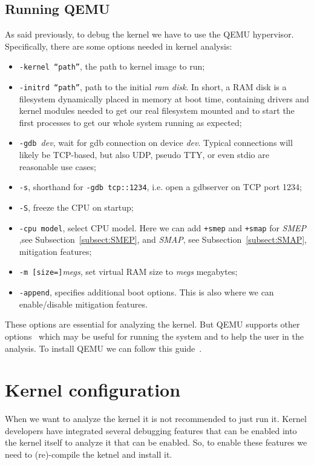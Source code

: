 \documentclass{masterthesis}
\newcommand{\refToSubSection}[1]{Subsection~\ref{subsect:#1}\xspace}
\begin{document}
\subsection{Running QEMU}
\label{subsect:QEMU}
As said previously, to debug the kernel we have to use the QEMU hypervisor. Specifically, there are some options needed in kernel analysis:
\begin{itemize}
\item \texttt{-kernel  ``path''}, the path to kernel image to run;
\item \texttt{-initrd ``path''}, path to the initial \emph{ram disk}. In short, a RAM disk is a filesystem dynamically placed in memory at boot time, containing drivers and kernel modules needed to get our real filesystem mounted and to start the first processes to get our whole system running as expected;
\item \texttt{-gdb }\textit{dev}, wait for gdb connection on device \textit{dev}. Typical connections will likely be TCP-based, but also UDP, pseudo TTY, or even stdio are reasonable use cases;
\item \texttt{-s}, shorthand for \texttt{-gdb tcp::1234}, i.e. open a gdbserver on TCP port 1234;
\item \texttt{-S}, freeze the CPU on startup;
\item \texttt{-cpu model}, select CPU model. Here we can add \texttt{+smep} and \texttt{+smap} for \emph{SMEP} ,see \refToSubSection{SMEP}, and \emph{SMAP}, see \refToSubSection{SMAP}, mitigation features;
\item \texttt{-m [size=]}\textit{megs}, set virtual RAM size to \textit{megs} megabytes;
\item \texttt{-append}, specifies additional boot options. This is also where we can enable/disable mitigation features.
\end{itemize}
These options are essential for analyzing the kernel. But QEMU supports other options~\cite{qemuoption} which may be useful for running the system and to help the user in the analysis.
To install QEMU we can follow this guide~\cite{qemuinstall}. 
\section{Kernel configuration}
\label{sect:configuration}
When we want to analyze the kernel it is not recommended to just run it. Kernel developers have integrated several debugging features that can be enabled into the kernel itself to analyze it that can be enabled.
So, to enable these features we need to (re)-compile the ketnel and install it.
\end{document}
